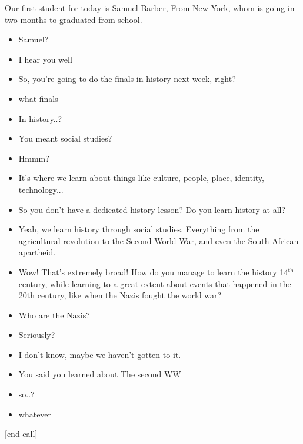 \documentclass[]{../../../../tex/classes/styledArticle}
\begin{document}
	Our first student for today is Samuel Barber, From New York, whom is going in two months to graduated from school. 
	\begin{itemize}
		\item[(I)] Samuel? 
		\item[(II)] I hear you well 
		\item[(I)] So, you're going to do the finals in history next week, right? 
		\item[(II)] what finals
		\item[(I)] In history..?
		\item[(II)] You meant social studies? 
		\item[(I)] Hmmm?
		\item[(II)] It's where we learn about things like culture, people, place, identity, technology... 
		\item[(I)] So you don't have a dedicated history lesson? Do you learn history at all? 
		\item[(II)] Yeah, we learn history through social studies. Everything from the agricultural revolution to the Second World War, and even the South African apartheid. 
		\item[(I)] Wow! That's extremely broad! How do you manage to learn the history 14$^{\text{th}}$ century, while learning to a great extent about events that happened in the 20th century, like when the Nazis fought the world war? 
		\item[(II)] Who are the Nazis? 
		\item[(I)] Seriously? 
		\item[(II)] I don't know, maybe we haven't gotten to it. 
		\item[(I)] You said you learned about The second WW
		\item[(II)] so..?
		\item[(I)] whatever
	\end{itemize}
	[end call]
	
\end{document}
